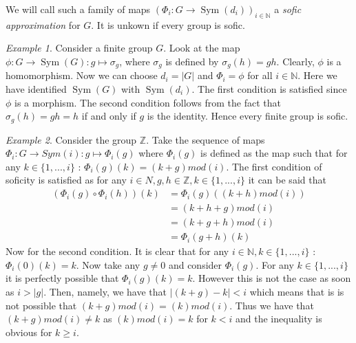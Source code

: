 \documentclass[titlepage, a4paper]{article}
\newcommand{\N}{\mathbb{N}}
\newcommand{\Z}{\mathbb{Z}}
\newcommand{\card}[1]{\left| #1 \right|}
\DeclareMathOperator{\sym}{Sym}
\theoremstyle{remark}
\newtheorem{example}{Example}
\begin{document}
    We will call such a family of maps $\left(\Phi_i : G \to \sym(d_i) \right)_{i \in \N}$ a \emph{sofic approximation} for $G$. It is unkown if every group is sofic.

    \begin{example}\label{ex:finite_group_sofic}
    Consider a finite group $G$. Look at the map $\phi: G \to \sym(G): g \mapsto \sigma_g$, where $\sigma_g$ is defined by $\sigma_g(h) = gh$. Clearly, $\phi$ is a homomorphism. Now we can choose $d_i = \card G$ and $\Phi_i = \phi$ for all $i \in \N$. Here we have identified $\sym(G)$ with $\sym(d_i)$. The first condition is satisfied since $\phi$ is a morphism. The second condition follows from the fact that $\sigma_g(h) = gh = h$ if and only if $g$ is the identity.
     Hence every finite group is sofic.
    \end{example}


	\begin{example}\label{ex:Z}
	Consider the group $\Z$. Take the sequence of maps $\Phi_{i}: G \to Sym(i): g \mapsto \Phi_{i}(g)$ where $\Phi_{i}(g)$ is defined as the map such that for any $k \in \{1,...,i\}$ : $ \Phi_{i}(g)(k) = (k+g)mod(i)$. The first condition of soficity is satisfied as for any $i \in N, g,h \in \Z, k \in \{1,..., i\}$ it can be said that 
	\begin{align*}
	(\Phi_{i}(g) \circ \Phi_{i}(h))(k) &= \Phi_{i}(g)((k+h)mod(i))\\
	&= (k+h+g)mod(i)\\
	&= (k+g+h)mod(i)\\
	&= \Phi_{i}(g+h)(k)
\end{align*}		
	Now for the second condition. It is clear that for any $i \in \N, k \in \{1,..., i\}$ : $\Phi_{i}(0)(k) = k$. Now take any $g \neq 0$ and consider $\Phi_{i}(g)$. For any $k \in \{1,...,i\}$ it is perfectly possible that $\Phi_{i}(g)(k) = k$. However this is not the case as soon as $i > |g|$. Then, namely, we have that $|(k+g)-k| < i$ which means that is is not possible that $(k+g)mod(i) = (k)mod(i)$. Thus we have that $(k+g)mod(i) \neq k$ as $(k)mod(i) = k$ for $k<i$ and the inequality is obvious for $k \geq i$.
	\end{example}
\end{document}
